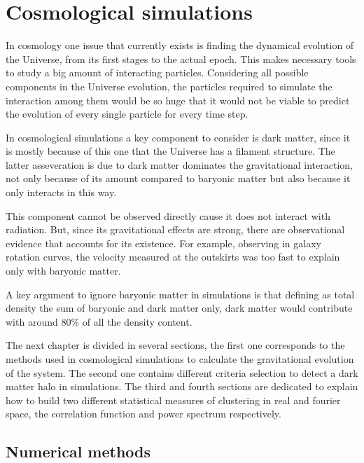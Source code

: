 \chapter{ Cosmological simulations }


In cosmology one issue that currently exists is finding 
the dynamical evolution of the Universe, from its first 
stages to the actual epoch. This makes necessary tools to
study a big amount of interacting particles. 
Considering all possible components in the Universe evolution, 
the particles required to simulate the interaction among them
would be so huge that it would not be viable
to predict the evolution of every single particle for every
time step. 

In cosmological simulations a key component to consider
is dark matter, since it is mostly because of this one that 
the Universe has a filament structure. 
The latter asseveration is due to dark matter dominates the gravitational
interaction, not only because of its amount compared to
baryonic matter but also because it only interacts in this way.

This component cannot be observed directly cause it does not interact 
with radiation. But, since its gravitational effects are strong, there are 
observational evidence that accounts for its existence. For example, 
observing in galaxy rotation curves, the velocity measured at the outskirts 
was too fast to explain only with baryonic matter. 

A key argument to ignore baryonic matter in simulations is that
defining as total density the sum of baryonic and dark matter only, 
dark matter would contribute with around $80\%$ of all the density
content. 

The next chapter is divided in several sections, the first one
corresponds to the methods used in cosmological simulations to
calculate the gravitational evolution of the system. The second
one contains different criteria selection to detect a dark matter
halo in simulations. The third and fourth sections are dedicated
to explain how to build two different statistical measures of clustering
in real and fourier space, the correlation function and power spectrum 
respectively. 


\section{ Numerical methods }


